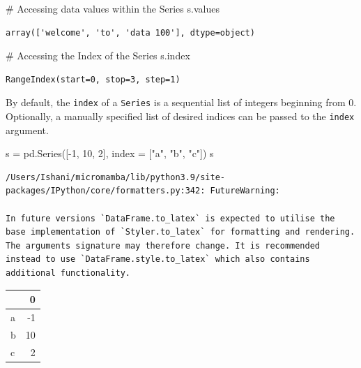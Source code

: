 \documentclass[
  letterpaper,
  DIV=11,
  numbers=noendperiod]{scrreprt}
\newenvironment{Shaded}{\begin{snugshade}}{\end{snugshade}}
\newcommand{\CommentTok}[1]{\textcolor[rgb]{0.37,0.37,0.37}{#1}}
\newcommand{\DecValTok}[1]{\textcolor[rgb]{0.68,0.00,0.00}{#1}}
\newcommand{\NormalTok}[1]{\textcolor[rgb]{0.00,0.23,0.31}{#1}}
\newcommand{\OperatorTok}[1]{\textcolor[rgb]{0.37,0.37,0.37}{#1}}
\newcommand{\StringTok}[1]{\textcolor[rgb]{0.13,0.47,0.30}{#1}}
\begin{document}
\begin{Shaded}
\begin{Highlighting}[]
 \CommentTok{\# Accessing data values within the Series}
\NormalTok{ s.values}
\end{Highlighting}
\end{Shaded}

\begin{verbatim}
array(['welcome', 'to', 'data 100'], dtype=object)
\end{verbatim}

\begin{Shaded}
\begin{Highlighting}[]
 \CommentTok{\# Accessing the Index of the Series}
\NormalTok{ s.index}
\end{Highlighting}
\end{Shaded}

\begin{verbatim}
RangeIndex(start=0, stop=3, step=1)
\end{verbatim}

By default, the \texttt{index} of a \texttt{Series} is a sequential list
of integers beginning from 0. Optionally, a manually specified list of
desired indices can be passed to the \texttt{index} argument.

\begin{Shaded}
\begin{Highlighting}[]
\NormalTok{s }\OperatorTok{=}\NormalTok{ pd.Series([}\OperatorTok{{-}}\DecValTok{1}\NormalTok{, }\DecValTok{10}\NormalTok{, }\DecValTok{2}\NormalTok{], index }\OperatorTok{=}\NormalTok{ [}\StringTok{"a"}\NormalTok{, }\StringTok{"b"}\NormalTok{, }\StringTok{"c"}\NormalTok{])}
\NormalTok{s}
\end{Highlighting}
\end{Shaded}

\begin{verbatim}
/Users/Ishani/micromamba/lib/python3.9/site-packages/IPython/core/formatters.py:342: FutureWarning:

In future versions `DataFrame.to_latex` is expected to utilise the base implementation of `Styler.to_latex` for formatting and rendering. The arguments signature may therefore change. It is recommended instead to use `DataFrame.style.to_latex` which also contains additional functionality.
\end{verbatim}

\begin{tabular}{lr}
\toprule
{} &   0 \\
\midrule
a &  -1 \\
b &  10 \\
c &   2 \\
\bottomrule
\end{tabular}
\end{document}
